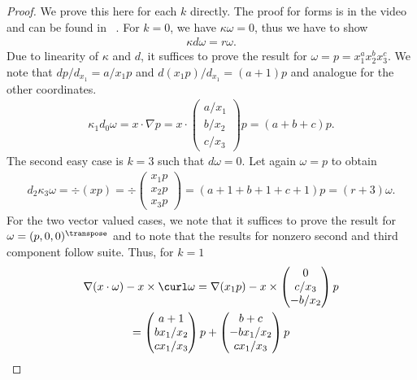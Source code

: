 \begin{proof}
  We prove this here
  for each $k$ directly. The proof for forms is in the video and can be found in ~\cite{ArnoldFalkWinther06}. For $k=0$, we have $\kappa\omega = 0$, thus
  we have to show
  \begin{gather}
    \kappa d\omega = r\omega.
  \end{gather}
  Due to linearity of $\kappa$ and $d$, it suffices to prove the
  result for $\omega = p=x_1^ax_2^bx_3^c$. We note that $dp/d_{x_1} =
  a/x_1 p$ and $d(x_1 p)/d_{x_1} = (a+1) p$ and analogue for the other
  coordinates.
  \begin{gather}
    \kappa_1 d_0\omega = x\cdot \nabla p = x\cdot
    \begin{pmatrix}
      a/x_1\\b/x_2\\c/x_3
    \end{pmatrix}p
    = (a+b+c)p.
  \end{gather}
  The second easy case is $k=3$ such that $d\omega = 0$. Let again
  $\omega = p$ to obtain
  \begin{gather}
    d_2\kappa_3 \omega = \div(xp) = \div
    \begin{pmatrix}
      x_1 p \\x_2 p \\x_3 p
    \end{pmatrix}
    = (a+1+b+1+c+1) p = (r+3) \omega.
  \end{gather}
  For the two vector valued cases, we note that it suffices to prove
  the result for $\omega = (p,0,0)^\transpose$ and to note that the results for
  nonzero second and third component follow suite. Thus, for $k=1$
  \begin{multline}
    \nabla (x\cdot \omega) - x\times \curl \omega
    = \nabla(x_1 p) - x\times
    \begin{pmatrix}
      0\\c/x_3 \\ -b/x_2
    \end{pmatrix}p
    \\
    =
    \begin{pmatrix}
      a+1 \\ bx_1/x_2\\ cx_1/x_3
    \end{pmatrix}p
    +
    \begin{pmatrix}
      b+c \\ -bx_1/x_2\\cx_1/x_3
    \end{pmatrix}p

\end{multline}
\end{proof}
